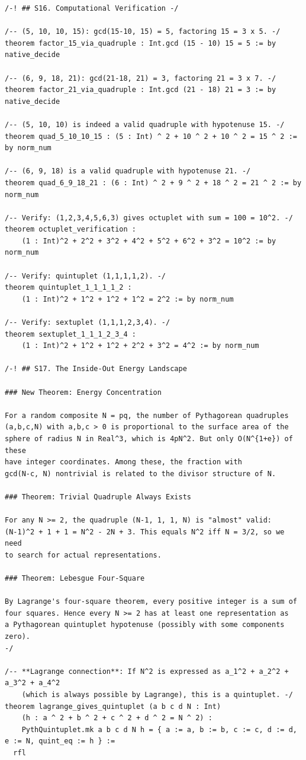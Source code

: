 \documentclass[11pt,openright,twoside]{book}
\theoremstyle{definition}
\begin{document}
\begin{lstlisting}[style=lean]
/-! ## S16. Computational Verification -/

/-- (5, 10, 10, 15): gcd(15-10, 15) = 5, factoring 15 = 3 x 5. -/
theorem factor_15_via_quadruple : Int.gcd (15 - 10) 15 = 5 := by native_decide

/-- (6, 9, 18, 21): gcd(21-18, 21) = 3, factoring 21 = 3 x 7. -/
theorem factor_21_via_quadruple : Int.gcd (21 - 18) 21 = 3 := by native_decide

/-- (5, 10, 10) is indeed a valid quadruple with hypotenuse 15. -/
theorem quad_5_10_10_15 : (5 : Int) ^ 2 + 10 ^ 2 + 10 ^ 2 = 15 ^ 2 := by norm_num

/-- (6, 9, 18) is a valid quadruple with hypotenuse 21. -/
theorem quad_6_9_18_21 : (6 : Int) ^ 2 + 9 ^ 2 + 18 ^ 2 = 21 ^ 2 := by norm_num

/-- Verify: (1,2,3,4,5,6,3) gives octuplet with sum = 100 = 10^2. -/
theorem octuplet_verification :
    (1 : Int)^2 + 2^2 + 3^2 + 4^2 + 5^2 + 6^2 + 3^2 = 10^2 := by norm_num

/-- Verify: quintuplet (1,1,1,1,2). -/
theorem quintuplet_1_1_1_1_2 :
    (1 : Int)^2 + 1^2 + 1^2 + 1^2 = 2^2 := by norm_num

/-- Verify: sextuplet (1,1,1,2,3,4). -/
theorem sextuplet_1_1_1_2_3_4 :
    (1 : Int)^2 + 1^2 + 1^2 + 2^2 + 3^2 = 4^2 := by norm_num

/-! ## S17. The Inside-Out Energy Landscape

### New Theorem: Energy Concentration

For a random composite N = pq, the number of Pythagorean quadruples
(a,b,c,N) with a,b,c > 0 is proportional to the surface area of the
sphere of radius N in Real^3, which is 4pN^2. But only O(N^{1+e}) of these
have integer coordinates. Among these, the fraction with
gcd(N-c, N) nontrivial is related to the divisor structure of N.

### Theorem: Trivial Quadruple Always Exists

For any N >= 2, the quadruple (N-1, 1, 1, N) is "almost" valid:
(N-1)^2 + 1 + 1 = N^2 - 2N + 3. This equals N^2 iff N = 3/2, so we need
to search for actual representations.

### Theorem: Lebesgue Four-Square

By Lagrange's four-square theorem, every positive integer is a sum of
four squares. Hence every N >= 2 has at least one representation as
a Pythagorean quintuplet hypotenuse (possibly with some components zero).
-/

/-- **Lagrange connection**: If N^2 is expressed as a_1^2 + a_2^2 + a_3^2 + a_4^2
    (which is always possible by Lagrange), this is a quintuplet. -/
theorem lagrange_gives_quintuplet (a b c d N : Int)
    (h : a ^ 2 + b ^ 2 + c ^ 2 + d ^ 2 = N ^ 2) :
    PythQuintuplet.mk a b c d N h = { a := a, b := b, c := c, d := d, e := N, quint_eq := h } :=
  rfl


\end{lstlisting}
\end{document}
